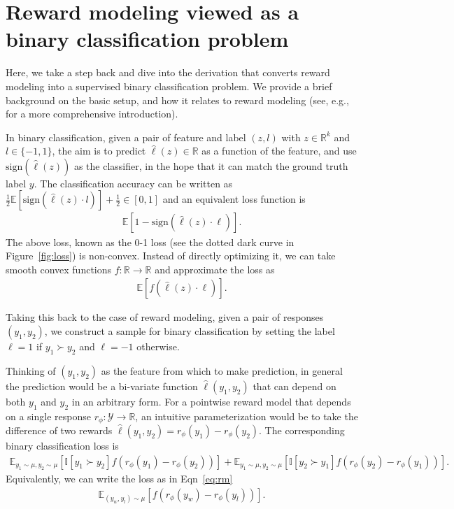 \section{Reward modeling viewed as a binary classification problem} \label{sec:derivation}

Here, we take a step back and dive into the derivation that converts reward modeling into a supervised binary classification problem. We provide a brief background on the basic setup, and how it relates to reward modeling (see, e.g., \citealp{hastie2009elements} for a more comprehensive introduction).

In binary classification, given a pair of feature and label $(z, l)$ with $z\in\mathbb{R}^k$ and $l \in\{-1,1\}$, the aim is to predict $\hat{\ell}(z)\in\mathbb{R}$ as a function of the feature, and use $\text{sign}\left(\hat{\ell}(z)\right)$ as the classifier, in the hope that it can match the ground truth label $y$. The classification accuracy can be written as $\frac{1}{2}\mathbb{E}\left[\text{sign}\left(\hat{\ell}(z)\cdot l\right)\right] + \frac{1}{2} \in [0,1]$ and an equivalent loss function is
\begin{align}
    \mathbb{E}\left[1-\text{sign}\left(\hat{\ell}(z)\cdot \ell\right)\right].\label{eq:0-1}
\end{align}
The above loss, known as the 0-1 loss (see the dotted dark curve in Figure~\ref{fig:loss}) is non-convex. Instead of directly optimizing it, we can take smooth convex functions $f:\mathbb{R}\rightarrow\mathbb{R}$ and approximate the loss as
\begin{align*}
    \mathbb{E}\left[f\left(\hat{\ell}(z)\cdot \ell\right)\right].
\end{align*}

Taking this back to the case of reward modeling, given a pair of responses $(y_1,y_2)$, we construct a sample for binary classification by setting the label $\ell=1$ if $y_1\succ y_2$ and $\ell=-1$ otherwise. 

Thinking of $(y_1,y_2)$ as the feature from which to make prediction, in general the prediction would be a bi-variate function $\hat{\ell}(y_1,y_2)$ that can depend on both $y_1$ and $y_2$ in an arbitrary form. For a pointwise reward model that depends on a single response $r_\phi:\mathcal{Y}\rightarrow\mathbb{R}$, an intuitive parameterization would be to take the difference of two rewards $\hat{\ell}(y_1,y_2)=r_\phi(y_1)-r_\phi(y_2)$. The corresponding binary classification loss is
\begin{align*}
    \mathbb{E}_{y_1\sim\mu,y_2\sim\mu}\left[\mathbb{I}\left[y_1\succ y_2\right] f\left(r_\phi(y_1)-r_\phi(y_2)\right)\right] + \mathbb{E}_{y_1\sim\mu,y_2\sim\mu}\left[\mathbb{I}\left[y_2\succ y_1\right] f\left(r_\phi(y_2)-r_\phi(y_1)\right)\right].
\end{align*}
Equivalently, we can write the loss as in Eqn~\eqref{eq:rm}
\begin{align*}
    \mathbb{E}_{(y_w,y_l)\sim \mu}\left[f\left(r_\phi(y_w)-r_\phi(y_l)\right)\right].
\end{align*}


